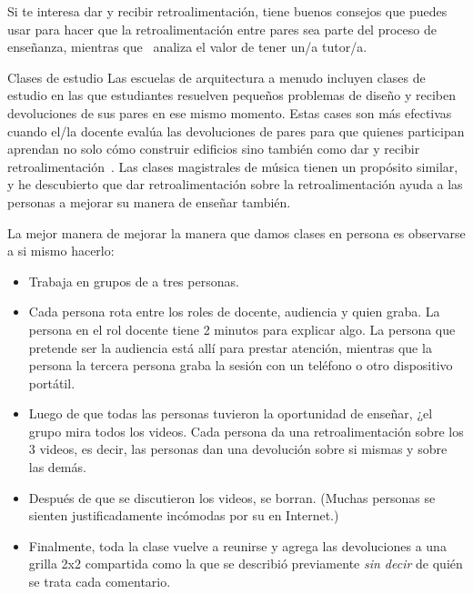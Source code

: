 Si te interesa dar y recibir retroalimentación,
\cite{Gorm2014} tiene buenos consejos 
que puedes usar para hacer que la retroalimentación entre pares sea parte del proceso de enseñanza,
mientras que~\cite{Gawa2011} analiza el valor de tener un/a tutor/a.

\begin{aside}{Clases de estudio}
  Las escuelas de arquitectura a menudo incluyen clases de estudio
  en las que estudiantes resuelven pequeños problemas de diseño
  y reciben devoluciones de sus pares en ese mismo momento.
  Estas cases son más efectivas cuando el/la docente evalúa las devoluciones de pares 
  para que quienes participan aprendan no solo cómo construir edificios
  sino también como dar y recibir retroalimentación~\cite{Scho1984}.
  Las clases magistrales de música tienen un propósito similar,
  y he descubierto que dar retroalimentación sobre la retroalimentación 
  ayuda a las personas a mejorar su manera de enseñar también.
\end{aside}


La mejor manera de mejorar la manera que damos clases en persona es observarse a si mismo hacerlo:

\begin{itemize}

\item
  Trabaja en grupos de a tres personas.

\item
  Cada persona rota entre los roles de docente, audiencia y quien graba.
  La persona en el rol docente tiene 2 minutos para explicar algo.
  La persona que pretende ser la audiencia está allí para prestar atención,
  mientras que la persona la tercera persona graba la sesión con un teléfono o otro dispositivo portátil.

\item
  Luego de que todas las personas tuvieron la oportunidad de enseñar,
  ¿el grupo mira todos los videos.
  Cada persona da una retroalimentación sobre los 3 videos,
  es decir, las personas dan una devolución sobre si mismas y sobre las demás.
  
\item
  Después de que se discutieron los videos,
  se borran.
  (Muchas personas se sienten justificadamente incómodas por su en Internet.)

\item
  Finalmente,
  toda la clase vuelve a reunirse 
  y agrega las devoluciones a una grilla 2x2 compartida como la que se describió previamente
  \emph{sin decir} de quién se trata cada comentario.

\end{itemize}


